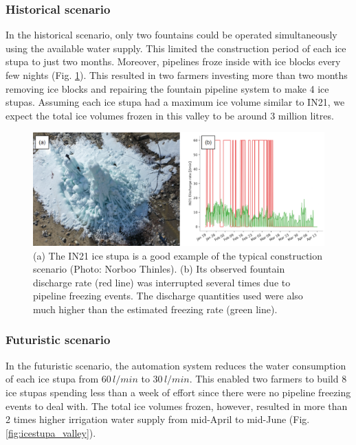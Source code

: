 \documentclass[tc, manuscript]{copernicus}
\begin{document}
\subsubsection{Historical scenario}

In the historical scenario, only two fountains could be operated simultaneously using the available water
supply. This limited the construction period of each ice stupa to just two months. Moreover, pipelines froze
inside with ice blocks every few nights (Fig. \ref{fig:gangles_data}). This resulted in two farmers investing
more than two months removing ice blocks and repairing the fountain pipeline system to make 4 ice stupas.
Assuming each ice stupa had a maximum ice volume similar to IN21, we expect the total ice volumes frozen in this
valley to be around 3 million litres.   

\begin{figure}[htb]
	\includegraphics[width=\textwidth]{Figures/gangles_data}

  \caption{(a) The IN21 ice stupa is a good example of the typical construction scenario (Photo: Norboo
  Thinles). (b) Its observed fountain discharge rate (red line) was interrupted several times due to pipeline
freezing events. The discharge quantities used were also much higher than the estimated freezing rate (green
line). }

	\label{fig:gangles_data}
\end{figure}

\subsubsection{Futuristic scenario}

In the futuristic scenario, the automation system reduces the water consumption of each ice stupa from
$60\,l/min$ to $30\,l/min$. This enabled two farmers to build 8 ice stupas spending less than a week of effort
since there were no pipeline freezing events to deal with. The total ice volumes frozen, however, resulted in
more than 2 times higher irrigation water supply from mid-April to mid-June (Fig. \ref{fig:icestupa_valley}).
\end{document}
